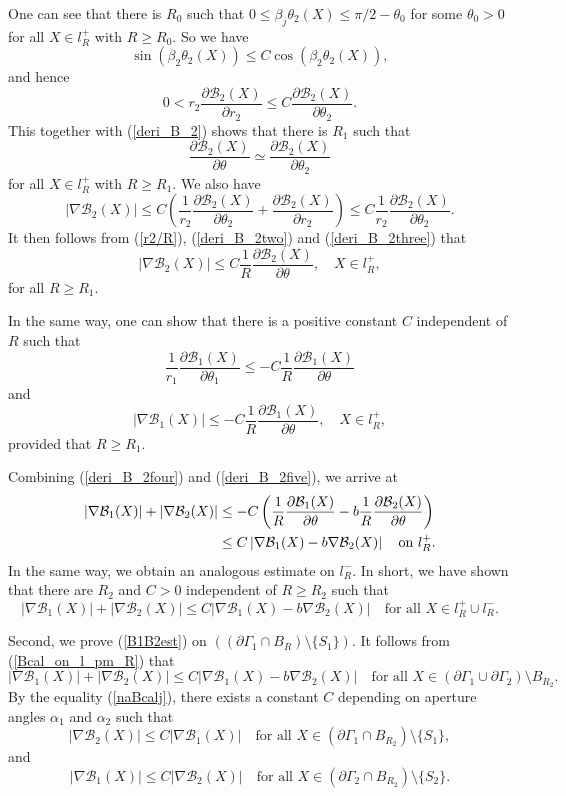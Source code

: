 \documentclass[11pt,a4paper]{article}
\numberwithin{equation}{section}
\newcommand{\p}{\partial}
\newcommand{\eqnref}[1]{(\ref {#1})}
\newcommand{\Bcal}{\mathcal{B}}
\newcommand{\Ga}{\alpha}
\newcommand{\Gb}{\beta}
\newcommand{\Gt}{\theta}
\newcommand{\GG}{\Gamma}
\newcommand{\beq}{\begin{equation}}
\newcommand{\eeq}{\end{equation}}
\begin{document}
One can see that there is $R_0$ such that $0 \le \Gb_j \Gt_2(X) \le \pi/2 - \Gt_0$ for some $\Gt_0 >0$ for all $X \in l_R^+$ with $R \ge R_0$. So we have
$$
\sin (\Gb_2 \Gt_2 (X)) \le C \cos (\Gb_2 \Gt_2 (X)),
$$
and hence
\beq\label{GtGt2}
0< r_2 \frac{\p \Bcal_2 (X)}{\p r_2} \leq C \frac {\p \Bcal_2 (X)} {\p \Gt_2} .
\eeq
This together with \eqnref{deri_B_2} shows that there is $R_1$ such that
\beq\label{deri_B_2two}
\frac {\p \Bcal_2(X)}{\p \Gt} \simeq \frac {\p \Bcal_2 (X) }{\p \Gt_2}
\eeq
for all $X \in l_R^+$ with $R \ge R_1$. We also have
\beq\label{deri_B_2three}
|\nabla \Bcal_2 (X) | \leq C \left( \frac 1{r_2}  \frac{\p \Bcal_2(X)}{\p \Gt_2} + \frac{\p \Bcal_2 (X)}{\p r_2} \right) \leq C \frac 1{r_2}  \frac{\p \Bcal_2(X)}{\p \Gt_2}.
\eeq
It then follows from \eqnref{r2/R}, \eqnref{deri_B_2two} and \eqnref{deri_B_2three} that
\beq\label{deri_B_2four}
|\nabla \Bcal_2 (X) | \leq C \frac 1{R}  \frac{\p \Bcal_2 (X)}{\p \Gt}, \quad X\in l_R ^+ ,
\eeq
for all $R\ge R_1$.

In the same way, one can show that there is a positive constant $C$ independent of $R$ such that
$$
\frac 1 {r_1} \frac{\p \Bcal_1(X)}{\p\Gt_1} \leq -C \frac 1 R \frac{\p \Bcal_1(X)}{\p \Gt}
$$
and
\beq\label{deri_B_2five}
|\nabla \Bcal_1 (X) |  \leq - C \frac 1 R \frac{\p \Bcal_1(X)}{\p \Gt}, \quad X \in l_R ^+ ,
\eeq
provided that $R \ge R_1$.


Combining \eqnref{deri_B_2four} and \eqnref{deri_B_2five}, we arrive at
\begin{align}
|\nabla \Bcal_1 (X)| + |\nabla \Bcal_2 (X)| & \leq - C \left( \frac 1 R \frac {\p \Bcal_1 (X)} {\p \Gt} - b \frac 1 R \frac {\p \Bcal_2  (X)} {\p \Gt}\right)\notag \\
& \leq  C \left| \nabla  {\Bcal_1 (X)}- b  \nabla { \Bcal_2  (X)}\right| \quad \mbox{on } l_R^+.\notag
\end{align}
In the same way, we obtain an analogous estimate on $l_R^-$. In short, we have shown that there are $R_2$ and $C>0$ independent of $R \ge R_2$ such that
\beq\label{Bcal_on_l_pm_R}
|\nabla \Bcal_1 (X)| + |\nabla \Bcal_2 (X)|  \leq  C \left| \nabla  {\Bcal_1 (X)}- b  \nabla { \Bcal_2  (X)}\right| \quad\mbox{for all } X \in l_R^+ \cup l_R^-.  
\eeq


Second, we prove \eqnref{B1B2est} on $( ( \p \GG_1 \cap B_R ) \setminus \{S_1 \})$. It follows from \eqnref{Bcal_on_l_pm_R} that
\beq\label{Bcal_on_GG_setminus_R_2}
|\nabla \Bcal_1 (X)| + |\nabla \Bcal_2 (X)|  \leq  C \left| \nabla  {\Bcal_1 (X)}- b  \nabla { \Bcal_2  (X)}\right| \quad\mbox{for all } X \in  (\p \GG_1 \cup \p \GG_2)\setminus B_{R_2}.
\eeq
By the equality \eqnref{naBcalj}, there exists a constant $C$ depending on aperture angles $\Ga_1 $ and $ \Ga_2$ such that
\beq\label{Bcal2Bcal1}
| \nabla \Bcal_2 (X) |  \le C | \nabla \Bcal_1 (X) | \quad\mbox{for all } X \in  ( \p \GG_1 \cap B_{R_2} ) \setminus \{S_1\},
\eeq
and
\beq
| \nabla \Bcal_1 (X) |  \le C | \nabla \Bcal_2 (X) | \quad\mbox{for all } X \in  ( \p \GG_2 \cap B_{R_2} ) \setminus \{S_2\}.
\eeq
\end{document}
